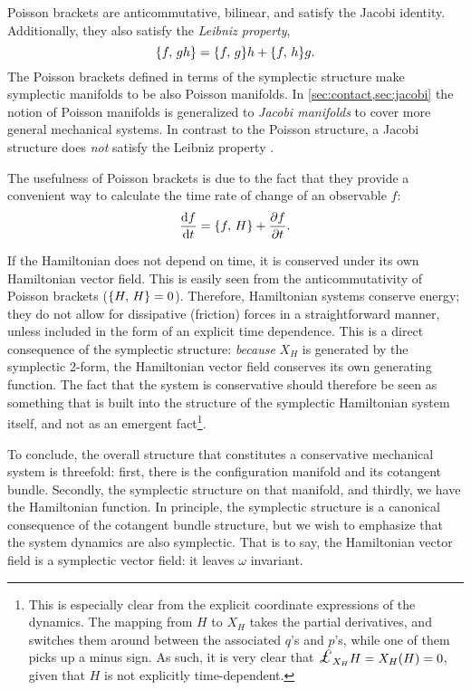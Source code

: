 Poisson brackets are anticommutative, bilinear, and satisfy the Jacobi identity. Additionally, they also satisfy the \emph{Leibniz property}, 
\begin{equation}
     \qty{f,\,gh} = \qty{f,\,g} h + \qty{f,\,h} g.
\end{equation}
The Poisson brackets defined in terms of the symplectic structure make symplectic manifolds to be also Poisson manifolds. In \cref{sec:contact,sec:jacobi} the notion of Poisson manifolds is generalized to \emph{Jacobi manifolds} to cover more general mechanical systems. In contrast to the Poisson structure, a Jacobi structure does \emph{not} satisfy the Leibniz property \cite{Arnold1989,Libermann1987}.

The usefulness of Poisson brackets is due to the fact that they provide a convenient way to calculate the time rate of change of an observable \(f\): 
\begin{equation}
     \dv{f}{t} = \qty{f,\,H} + \pdv{f}{t}.
\end{equation}

If the Hamiltonian does not depend on time, it is conserved under its own Hamiltonian vector field. This is easily seen from the anticommutativity of Poisson brackets (\(\qty{H,\,H} = 0\)). Therefore, Hamiltonian systems conserve energy; they do not allow for dissipative (friction) forces in a straightforward manner, unless included in the form of an explicit time dependence. This is a direct consequence of the symplectic structure: \emph{because} \(X_H\) is generated by the symplectic 2-form, the Hamiltonian vector field conserves its own generating function. The fact that the system is conservative should therefore be seen as something that is built into the structure of the symplectic Hamiltonian system itself, and not as an emergent fact\footnote{This is especially clear from the explicit coordinate expressions of the dynamics. The mapping from \(H\) to \(X_H\) takes the partial derivatives, and switches them around between the associated \(q\)'s and \(p\)'s, while one of them picks up a minus sign. As such, it is very clear that \(\lied{X_H}{H} = X_H(H) = 0\), given that \(H\) is not explicitly time-dependent.}.

To conclude, the overall structure that constitutes a conservative mechanical system is threefold: first, there is the configuration manifold and its cotangent bundle. Secondly, the symplectic structure on that manifold, and thirdly, we have the Hamiltonian function. In principle, the symplectic structure is a canonical consequence of the cotangent bundle structure, but we wish to emphasize that the system dynamics are also symplectic. That is to say, the Hamiltonian vector field is a symplectic vector field: it leaves \(\omega\) invariant. 

